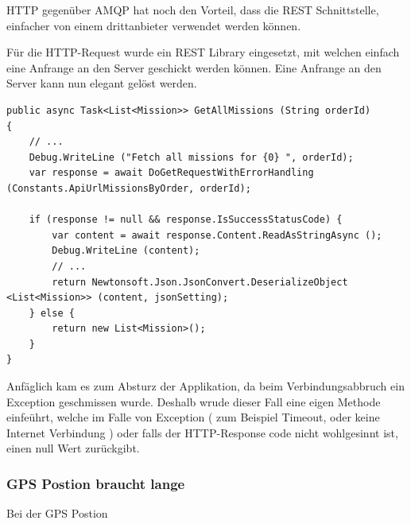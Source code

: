 HTTP gegenüber AMQP hat noch den Vorteil, dass die REST Schnittstelle, einfacher von einem drittanbieter verwendet werden können.

Für die HTTP-Request wurde ein REST Library eingesetzt, mit welchen einfach eine Anfrange an den Server geschickt werden können.
Eine Anfrange an den Server kann nun elegant gelöst werden.

\begin{lstlisting}
public async Task<List<Mission>> GetAllMissions (String orderId)
{
    // ...
    Debug.WriteLine ("Fetch all missions for {0} ", orderId);
    var response = await DoGetRequestWithErrorHandling (Constants.ApiUrlMissionsByOrder, orderId);

    if (response != null && response.IsSuccessStatusCode) {
        var content = await response.Content.ReadAsStringAsync ();
        Debug.WriteLine (content);
        // ...
        return Newtonsoft.Json.JsonConvert.DeserializeObject <List<Mission>> (content, jsonSetting);
    } else {
        return new List<Mission>();
    }
}
\end{lstlisting}

Anfäglich kam es zum Absturz der Applikation, da beim Verbindungsabbruch ein Exception geschmissen wurde.
Deshalb wrude dieser Fall eine eigen Methode einfeührt, welche im Falle von Exception ( zum Beispiel Timeout, oder keine Internet Verbindung ) oder falls der HTTP-Response code nicht wohlgesinnt ist, einen null Wert zurückgibt.

\subsubsection{GPS Postion braucht lange}
Bei der GPS Postion

